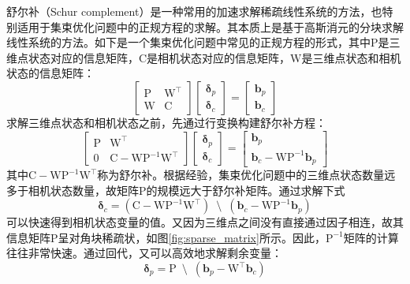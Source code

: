 舒尔补（Schur complement）是一种常用的加速求解稀疏线性系统的方法，也特别适用于集束优化问题中的正规方程的求解。其本质上是基于高斯消元的分块求解线性系统的方法。如下是一个集束优化问题中常见的正规方程的形式，其中$\mathrm{P}$是三维点状态对应的信息矩阵，$\mathrm{C}$是相机状态对应的信息矩阵，$\mathrm{W}$是三维点状态和相机状态的信息矩阵：
\begin{equation}
    \begin{bmatrix}
        \mathrm{P} & \mathrm{W}^\top \\
        \mathrm{W} & \mathrm{C}
    \end{bmatrix}
    \begin{bmatrix} \bm{\delta}_p \\ \bm{\delta}_c \end{bmatrix} =
    \begin{bmatrix} \bm{b}_p      \\ \bm{b}_c      \end{bmatrix}
\end{equation}
求解三维点状态和相机状态之前，先通过行变换构建舒尔补方程：
\begin{equation}
    \begin{bmatrix}
        \mathrm{P} & \mathrm{W}^\top \\
                 0 & \mathrm{C}-\mathrm{W}\mathrm{P}^{-1}\mathrm{W}^\top
    \end{bmatrix}
    \begin{bmatrix} \bm{\delta}_p \\ \bm{\delta}_c \end{bmatrix} =
    \begin{bmatrix}
        \bm{b}_p \\
        \bm{b}_c-\mathrm{W}\mathrm{P}^{-1}\bm{b}_p
    \end{bmatrix}
\end{equation}
其中$\mathrm{C}-\mathrm{W}\mathrm{P}^{-1}\mathrm{W}^\top$称为舒尔补。根据经验，集束优化问题中的三维点状态数量远多于相机状态数量，故矩阵$\mathrm{P}$的规模远大于舒尔补矩阵。通过求解下式
\begin{equation}
    \bm{\delta}_c = 
    \left( \mathrm{C}-\mathrm{W}\mathrm{P}^{-1}\mathrm{W}^\top \right)
    \enspace\setminus\enspace
    \left( \bm{b}_c-\mathrm{W}\mathrm{P}^{-1}\bm{b}_p \right)
    \label{eq:solve_schur}
\end{equation}
可以快速得到相机状态变量的值。又因为三维点之间没有直接通过因子相连，故其信息矩阵$\mathrm{P}$呈对角块稀疏状，如图\ref{fig:sparse_matrix}所示。因此，$\mathrm{P}^{-1}$矩阵的计算往往非常快速。通过回代，又可以高效地求解剩余变量：
\begin{equation}
    \bm{\delta}_p = \mathrm{P}
    \enspace\setminus\enspace
    \left( \bm{b}_p-\mathrm{W}^\top\bm{b}_c \right)
    \label{eq:back_sub}
\end{equation}

